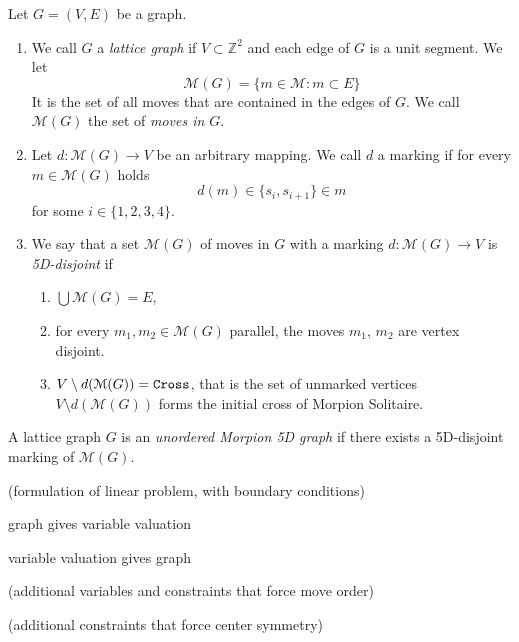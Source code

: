 \begin{definition} 
  Let $G = (V, E)$ be a graph. 
\begin{enumerate}
    \item We call $G$  a \emph{lattice graph} if $V \subset \mathbb{Z}^2$
      and each edge of $G$ is a unit segment.
    We let
    \[
      \mathcal{M}(G) = \{ m \in \mathcal{M} \colon m \subset E \}
    \]
    It is the set of all moves that are contained in the edges of $G$. We call $\mathcal{M}(G)$ the set of \emph{moves in $G$}.
    \item Let $d \colon \mathcal{M}(G) \to V$ be an arbitrary mapping. We call $d$ a marking if for every $m\in \mathcal{M}(G)$ holds
      \[
      	d(m) \in \{s_i, s_{i+1}\} \in m
      \]
    for some $i\in \{1,2,3,4\}$.
    \item We say that a set $\mathcal{M}(G)$ of moves in $G$ with a marking $d \colon \mathcal{M}(G) \to V$ is \emph{5D-disjoint} if
      \begin{enumerate}
        \item $\bigcup \mathcal{M}(G) = E$,
        \item for every $m_1, m_2 \in \mathcal{M}(G)$ parallel, the moves $m_1$, $m_2$ are vertex disjoint.
        \item $V \setminus d(\mathcal{M}(G)) = \texttt{Cross}$, that is the set of unmarked vertices $V \setminus d(\mathcal{M}(G))$ forms the initial cross of Morpion Solitaire.
      \end{enumerate}
  \end{enumerate}
\end{definition}

\begin{definition}
  A lattice graph $G$ is an \emph{unordered Morpion 5D graph} if there exists a 5D-disjoint marking of $\mathcal{M}(G)$. 
\end{definition}

(formulation of linear problem, with boundary conditions)

\begin{lemma}
  graph gives variable valuation
\end{lemma}

\begin{lemma}
  variable valuation gives graph
\end{lemma}

(additional variables and constraints that force move order)

(additional constraints that force center symmetry)
